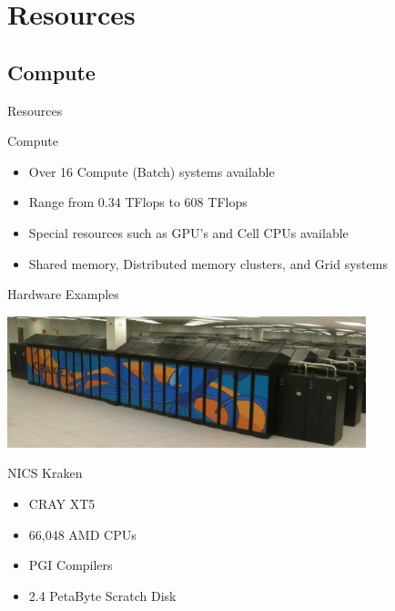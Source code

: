\documentclass[handout]{beamer}
\begin{document}
  \section{Resources}
  
  \subsection{Compute}
  \begin{frame}{Resources}
   \begin{block}{Compute}
    \begin{itemize}
      \item Over 16 Compute (Batch) systems available
      \item Range from 0.34 TFlops to 608 TFlops
      \item Special resources such as GPU's and Cell CPUs available
      \item Shared memory, Distributed memory clusters, and Grid systems
    \end{itemize}
   \end{block}
  \end{frame}

  \begin{frame}{Hardware Examples}
   \begin{center}\includegraphics[height=1.5in]{kraken}\end{center}
   \begin{block}{NICS Kraken}
    \begin{itemize}
     \item CRAY XT5
     \item 66,048 AMD CPUs
     \item PGI Compilers
     \item 2.4 PetaByte Scratch Disk
    \end{itemize}
   \end{block}
  \end{frame}
 
\end{document}
